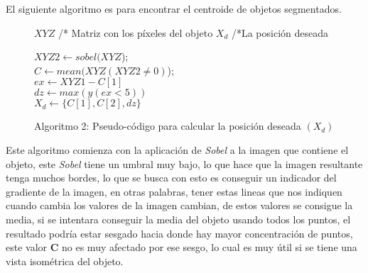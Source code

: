     El siguiente algoritmo es para encontrar el centroide de objetos segmentados.
    
    
    \begin{figure}[h]
    	\begin{algorithmic}[h]
    		\REQUIRE $XYZ$ /* Matriz con los píxeles del objeto
    		\ENSURE	$X_d$	/*La posición deseada
    		
    		\STATE $XYZ2 \leftarrow sobel(XYZ$);\\
    		$C \leftarrow mean(XYZ(XYZ2\neq0)$);\\
    		\STATE $ex \leftarrow XYZ{1}-C[1]$\\
    		$dz\leftarrow max(y(ex<5))$\\					
    		$X_d \leftarrow \{C[1], C[2], dz\}$
    	\end{algorithmic}
    	\caption{
    		Algoritmo 2: Pseudo-código para calcular la posición deseada $(X_d)$}
    	\label{alg2}
    \end{figure}
    
    Este algoritmo comienza con la aplicación de \textit{Sobel} a la imagen que contiene el objeto, este \textit{Sobel} tiene un umbral muy bajo, lo que hace que la imagen resultante tenga muchos bordes, lo que se busca con esto es conseguir un indicador del gradiente de la imagen, en otras palabras, tener estas lineas que nos indiquen cuando cambia los valores de la imagen cambian, de estos valores se consigue la media, si se intentara conseguir la media del objeto usando todos los puntos, el resultado podría estar sesgado hacia donde hay mayor concentración de puntos, este valor \textbf{C} no es muy afectado por ese sesgo, lo cual es muy útil si se tiene una vista isométrica del objeto.

